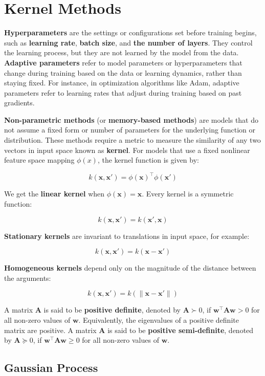 \section{Kernel Methods}\label{sec:kernel_methods}

\textbf{Hyperparameters} are the settings or configurations set before training begins, such as \textbf{learning rate}, \textbf{batch size}, and \textbf{the number of layers}.
They control the learning process, but they are not learned by the model from the data.
\textbf{Adaptive parameters} refer to model parameters or hyperparameters that change during training based on the data or learning dynamics, rather than staying fixed.
For instance, in optimization algorithms like Adam, adaptive parameters refer to learning rates that adjust during training based on past gradients.

\textbf{Non-parametric methods} (or \textbf{memory-based methods}) are models that do not assume a fixed form or number of parameters for the underlying function or distribution.
These methods require a metric to measure the similarity of any two vectors in input space known as \textbf{kernel}.
For models that use a fixed nonlinear feature space mapping $\phi(x)$, the kernel function is given by:

\[
    k(\bm{x},\bm{x}') = \phi(\bm{x})^\top\phi(\bm{x}')
\]

We get the \textbf{linear kernel} when $\phi(\bm{x}) = \bm{x}$.
Every kernel is a symmetric function:

\[
    k(\bm{x},\bm{x}') = k(\bm{x}',\bm{x})
\]

\textbf{Stationary kernels} are invariant to translations in input space, for example:

\[
    k(\bm{x}, \bm{x}') = k(\bm{x} - \bm{x}')
\]

\textbf{Homogeneous kernels} depend only on the magnitude of the distance between the arguments:

\[
    k(\bm{x}, \bm{x}') = k(\lVert \bm{x} - \bm{x}' \rVert)
\]

A matrix $\bm{A}$ is said to be \textbf{positive definite}, denoted by $\bm{A} \succ 0$, if $\bm{w}^\top\bm{A}\bm{w} > 0$ for all non-zero values of $\bm{w}$.
Equivalently, the eigenvalues of a positive definite matrix are positive.
A matrix $\bm{A}$ is said to be \textbf{positive semi-definite}, denoted by $\bm{A} \succeq 0$, if $\bm{w}^\top\bm{A}\bm{w} \ge 0$ for all non-zero values of $\bm{w}$.

\subsection{Gaussian Process}\label{subsec:gaussian-process}

